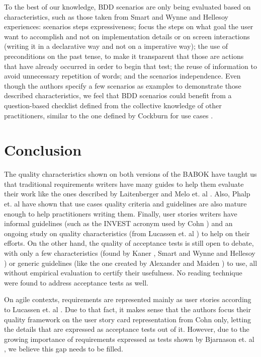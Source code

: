 To the best of our knowledge, BDD scenarios are only being evaluated based on characteristics, such as those taken from Smart \cite{Smart_2014} and Wynne and Hellesoy \cite{Wynne_and_Hellesoy_2012} experiences: scenarios steps expressiveness; focus the steps on what goal the user want to accomplish and not on implementation details or on screen interactions (writing it in a declarative way and not on a imperative way); the use of preconditions on the past tense, to make it transparent that those are actions that have already occurred in order to begin that test; the reuse of information to avoid unnecessary repetition of words; and the scenarios independence. Even though the authors \cite{Smart_2014}\cite{Wynne_and_Hellesoy_2012} specify a few scenarios as examples to demonstrate those described characteristics, we feel that BDD scenarios could benefit from a question-based checklist defined from the collective knowledge of other practitioners, similar to the one defined by Cockburn for use cases \cite{Cockburn_2000}.

\section{Conclusion}

The quality characteristics shown on both versions of the BABOK \cite{Babok_2009}\cite{Babok_2015} have taught us that traditional requirements writers have many guides to help them evaluate their work like the ones described by Laitenberger \cite{Laitenberger_2002} and Melo et. al \cite{Melo_et_dot_al_2001}. Also, Phalp et. al \cite{Phalp_et_dot_al_2011} have shown that use cases quality criteria and guidelines are also mature enough to help practitioners writing them. Finally, user stories writers have informal guidelines (such as the INVEST acronym used by Cohn \cite{Cohn_2004}) and an ongoing study on quality characteristics (from Lucassen et. al \cite{Lucassen_et_dot_al_2015}) to help on their efforts. On the other hand, the quality of acceptance tests is still open to debate, with only a few characteristics (found by Kaner \cite{Kaner_2003}, Smart \cite{Smart_2014} and Wynne and Hellesoy \cite{Wynne_and_Hellesoy_2012}) or generic guidelines (like the one created by Alexander and Maiden \cite{Alexander_and_Maiden_2004}) to use, all without empirical evaluation to certify their usefulness. No reading technique were found to address acceptance tests as well.  

On agile contexts, requirements are represented mainly as user stories according to Lucassen et. al \cite{Lucassen_et_dot_al_2015}. Due to that fact, it makes sense that the authors focus their quality framework on the user story card representation from Cohn \cite{Cohn_2004} only, letting the details that are expressed as acceptance tests out of it. However, due to the growing importance of requirements expressed as tests shown by Bjarnason et. al \cite{Bjarnason_et_dot_al_2016}, we believe this gap needs to be filled.

